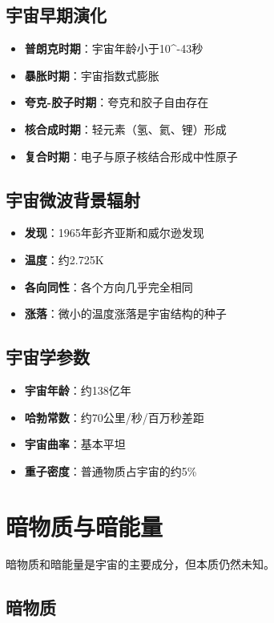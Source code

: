 \documentclass[12pt,UTF8]{ctexbook}
\begin{document}
\subsection{宇宙早期演化}

\begin{itemize}
  \item \textbf{普朗克时期}：宇宙年龄小于10^-43秒
  \item \textbf{暴胀时期}：宇宙指数式膨胀
  \item \textbf{夸克-胶子时期}：夸克和胶子自由存在
  \item \textbf{核合成时期}：轻元素（氢、氦、锂）形成
  \item \textbf{复合时期}：电子与原子核结合形成中性原子
\end{itemize}

\subsection{宇宙微波背景辐射}

\begin{itemize}
  \item \textbf{发现}：1965年彭齐亚斯和威尔逊发现
  \item \textbf{温度}：约2.725K
  \item \textbf{各向同性}：各个方向几乎完全相同
  \item \textbf{涨落}：微小的温度涨落是宇宙结构的种子
\end{itemize}

\subsection{宇宙学参数}

\begin{itemize}
  \item \textbf{宇宙年龄}：约138亿年
  \item \textbf{哈勃常数}：约70公里/秒/百万秒差距
  \item \textbf{宇宙曲率}：基本平坦
  \item \textbf{重子密度}：普通物质占宇宙的约5\%
\end{itemize}

\section{暗物质与暗能量}

暗物质和暗能量是宇宙的主要成分，但本质仍然未知。

\subsection{暗物质}
\end{document}
